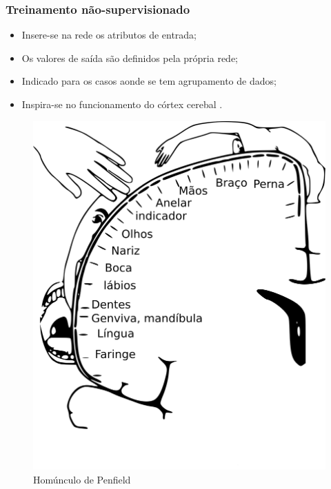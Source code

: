 \documentclass[10pt]{beamer} %
\begin{document}
\begin{frame}
	\frametitle{Treinamento não-supervisionado}
	\begin{itemize}
		\item  Insere-se na rede os atributos de entrada;
		\pause
		\item Os valores de saída são definidos pela própria rede;
		\pause
		\item Indicado para os casos aonde se tem agrupamento de dados;
		\pause
		\item Inspira-se no funcionamento do córtex cerebal \citep{Schott1993}.
	\end{itemize}
	
		\begin{figure}[H]
			\centering
			\includegraphics[scale=0.3]{Imagens/penfield.png}
			\caption{Homúnculo de Penfield }
			\label{penfield}
		\end{figure}
		
\end{frame}


\end{document}
